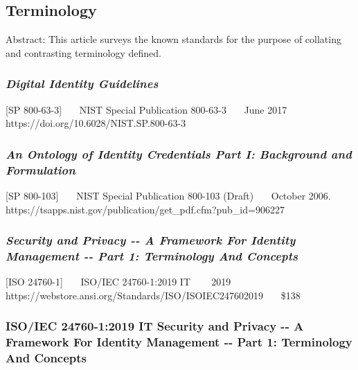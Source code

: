 \hypertarget{terminology}{%
\subsection{Terminology}\label{terminology}}

Abstract: This article surveys the known standards for the purpose of
collating and contrasting terminology defined.

\hypertarget{digital-identity-guidelines-1}{%
\subsubsection{\texorpdfstring{\emph{Digital Identity
Guidelines}}{Digital Identity Guidelines}}\label{digital-identity-guidelines-1}}

{[}SP 800-63-3{]}~~~ NIST Special Publication 800-63-3~~~ June 2017~~~
https://doi.org/10.6028/NIST.SP.800-63-3~~~

\hypertarget{an-ontology-of-identity-credentials-part-i-background-and-formulation}{%
\subsubsection{\texorpdfstring{\emph{An Ontology of Identity Credentials
Part I: Background and
Formulation}}{An Ontology of Identity Credentials Part I: Background and Formulation}}\label{an-ontology-of-identity-credentials-part-i-background-and-formulation}}

{[}SP 800-103{]}~~~ NIST Special Publication 800-103 (Draft)~~~ October
2006.~~~
https://tsapps.nist.gov/publication/get\_pdf.cfm?pub\_id=906227~~~

\hypertarget{security-and-privacy----a-framework-for-identity-management----part-1-terminology-and-concepts}{%
\subsubsection{\texorpdfstring{\emph{Security and Privacy -\/- A Framework
For Identity Management -\/- Part 1: Terminology And
Concepts}}{Security and Privacy -\/- A Framework For Identity Management -\/- Part 1: Terminology And Concepts}}\label{security-and-privacy----a-framework-for-identity-management----part-1-terminology-and-concepts}}

{[}ISO 24760-1{]}~~~ ISO/IEC 24760-1:2019 IT ~~~ 2019~~~
https://webstore.ansi.org/Standards/ISO/ISOIEC247602019~~~ \$138

\hypertarget{isoiec-24760-12019-it-security-and-privacy----a-framework-for-identity-management----part-1-terminology-and-concepts}{%
\subsubsection{ISO/IEC 24760-1:2019 IT Security and Privacy -\/- A Framework
For Identity Management -\/- Part 1: Terminology And
Concepts}\label{isoiec-24760-12019-it-security-and-privacy----a-framework-for-identity-management----part-1-terminology-and-concepts}}

